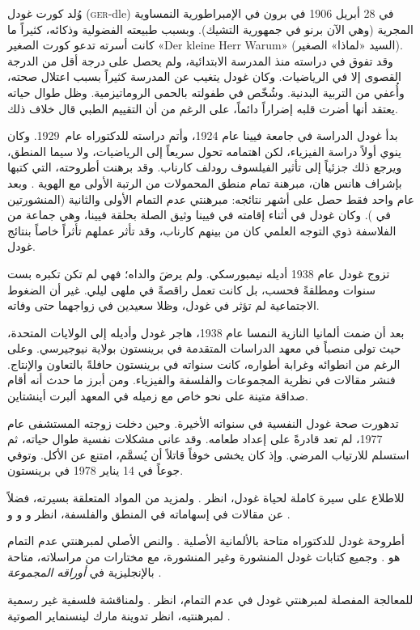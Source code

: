 \documentclass[../../../include/open-logic-section]{subfiles}
\begin{document}



وُلد كورت غودل (\textsc{ger}-dle) في 28 أبريل 1906 في برون في
الإمبراطورية النمساوية المجرية (وهي الآن برنو في جمهورية التشيك). وبسبب
طبيعته الفضولية وذكائه، كثيراً ما كانت أسرته تدعو كورت الصغير «Der kleine
Herr Warum» (السيد «لماذا» الصغير). وقد تفوق في دراسته منذ المدرسة
الابتدائية، ولم يحصل على درجة أقل من الدرجة القصوى إلا في الرياضيات. وكان
غودل يتغيب عن المدرسة كثيراً بسبب اعتلال صحته، وأُعفي من التربية البدنية.
وشُخّص في طفولته بالحمى الروماتيزمية. وظل طوال حياته يعتقد أنها أضرت قلبه
إضراراً دائماً، على الرغم من أن التقييم الطبي قال خلاف ذلك.

بدأ غودل الدراسة في جامعة فيينا عام 1924، وأتم دراسته للدكتوراه عام~1929.
وكان ينوي أولاً دراسة الفيزياء، لكن اهتمامه تحول سريعاً إلى الرياضيات،
ولا سيما المنطق، ويرجع ذلك جزئياً إلى تأثير الفيلسوف رودلف كارناب. وقد
برهنت أطروحته، التي كتبها بإشراف هانس هان، مبرهنة تمام منطق المحمولات من
الرتبة الأولى مع الهوية \citep{Godel1929}. وبعد عام واحد فقط حصل على أشهر
نتائجه: مبرهنتي عدم التمام الأولى والثانية (المنشورتين في
\citealt{Godel1931}). وكان غودل في أثناء إقامته في فيينا وثيق الصلة بحلقة
فيينا، وهي جماعة من الفلاسفة ذوي التوجه العلمي كان من بينهم كارناب، وقد
تأثر عملهم تأثراً خاصاً بنتائج غودل.

تزوج غودل عام 1938 أديله نيمبورسكي. ولم يرضَ والداه؛ فهي لم تكن تكبره بست
سنوات ومطلقةً فحسب، بل كانت تعمل راقصةً في ملهى ليلي. غير أن الضغوط
الاجتماعية لم تؤثر في غودل، وظلا سعيدين في زواجهما حتى وفاته.

بعد أن ضمت ألمانيا النازية النمسا عام 1938، هاجر غودل وأديله إلى الولايات
المتحدة، حيث تولى منصباً في معهد الدراسات المتقدمة في برينستون بولاية
نيوجيرسي. وعلى الرغم من انطوائه وغرابة أطواره، كانت سنواته في برينستون
حافلةً بالتعاون والإنتاج. فنشر مقالات في نظرية المجموعات والفلسفة
والفيزياء. ومن أبرز ما حدث أنه أقام صداقة متينة على نحو خاص مع زميله في
المعهد ألبرت أينشتاين.

تدهورت صحة غودل النفسية في سنواته الأخيرة. وحين دخلت زوجته المستشفى عام
1977، لم تعد قادرةً على إعداد طعامه. وقد عانى مشكلات نفسية طوال حياته، ثم
استسلم للارتياب المرضي. وإذ كان يخشى خوفاً قاتلاً أن يُسمَّم، امتنع عن
الأكل. وتوفي جوعاً في 14 يناير 1978 في برينستون.

\begin{reading}
للاطلاع على سيرة كاملة لحياة غودل، انظر \citet{Dawson1997}. ولمزيد من
المواد المتعلقة بسيرته، فضلاً عن مقالات في إسهاماته في المنطق والفلسفة،
انظر \citet{Wang1990} و\citet{Baaz2011} و\citet{Takeuti2003} و
\citet{Sigmund2007}.

أطروحة غودل للدكتوراه متاحة بالألمانية الأصلية \citep{Godel1929}.
والنص الأصلي لمبرهنتي عدم التمام هو \citep{Godel1931}. وجميع كتابات غودل
المنشورة وغير المنشورة، مع مختارات من مراسلاته، متاحة بالإنجليزية في
\emph{أوراقه المجموعة} \citet{Godel1986,Godel1990}.

للمعالجة المفصلة لمبرهنتي غودل في عدم التمام، انظر \citet{Smith2013}.
ولمناقشة فلسفية غير رسمية لمبرهنتيه، انظر تدوينة مارك لينسنماير الصوتية
\citep{Linsenmayer2014}.
\end{reading}
\end{document}
